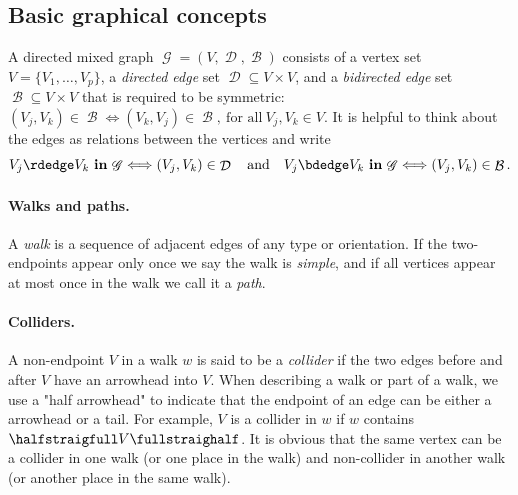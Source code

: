 \documentclass[12pt,a4paper]{article}
\theoremstyle{definition}
\newcommand{\ingraph}[1]{~\textnormal{\bf in}\,#1}
\DeclareMathOperator{\gG}{\mathscr{G}}
\DeclareMathOperator{\sD}{\mathcal{D}}
\DeclareMathOperator{\sB}{\mathcal{B}}
\begin{document}
\subsection{Basic graphical concepts}


A directed mixed graph $\gG = (V, \sD, \sB)$ consists of a vertex set
$V =
\{V_1,\dots,V_p\}$, a \emph{directed edge} set $\sD \subseteq V \times
V$, and a \emph{bidirected edge} set $\sB \subseteq V \times V$ that
is required to be symmetric: $(V_j,V_k) \in \sB \Longleftrightarrow
(V_k,V_j) \in \sB,~\text{for all}~V_j,V_k \in V$.
It is helpful to think about the edges as relations between the
vertices and write
\[
    V_j \rdedge V_k \ingraph{\gG} \Longleftrightarrow (V_j,V_k) \in \sD\quad\text{and}\quad V_j \bdedge V_k \ingraph{\gG} \Longleftrightarrow (V_j,V_k) \in \sB.
\]
\paragraph{Walks and paths.}
A \emph{walk} is a sequence of adjacent edges of any type or orientation. If the two-endpoints appear only once we say the walk is \emph{simple}, and if all vertices appear at most once in the walk we call it a \emph{path}. \vspace{-2ex}
\paragraph{Colliders.} A non-endpoint $V$ in a
walk $w$ is said to be a \emph{collider} if the two edges before and
after $V$ have an arrowhead into $V$. %
When describing a walk or part of a walk, we use a "half arrowhead"
to indicate that the endpoint of an edge can be either a arrowhead or
a tail. For example, $V$ is a collider in $w$ if $w$ contains
$\halfstraigfull V \fullstraighalf$. It is obvious that the same
vertex can be a collider in one walk (or one place in the walk) and
non-collider in another walk (or another place in the same
walk). %
\end{document}
